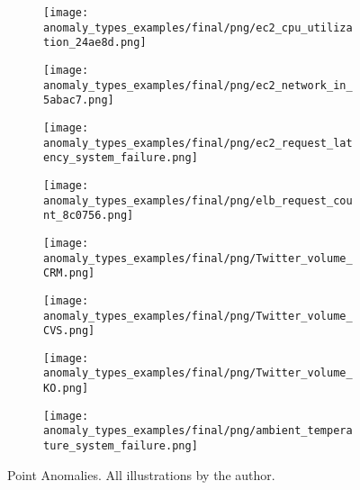 \begin{figure}[htp!]
    \centering
    \begin{subfigure}[t]{.49\linewidth}
        \centering
        \texttt{[image: anomaly\_types\_examples/final/png/ec2\_cpu\_utilization\_24ae8d.png]}
        \label{app-fig:ec2_cpu_utilization_24ae8d}
    \end{subfigure}
    \begin{subfigure}[t]{.49\linewidth}
        \centering
        \texttt{[image: anomaly\_types\_examples/final/png/ec2\_network\_in\_5abac7.png]}
        \label{app-fig:ec2_network_in_5abac7}
    \end{subfigure}
    \begin{subfigure}[t]{.49\linewidth}
        \centering
        \texttt{[image: anomaly\_types\_examples/final/png/ec2\_request\_latency\_system\_failure.png]}
        \label{app-fig:ec2_request_latency_system_failure}
    \end{subfigure}
    \begin{subfigure}[t]{.49\linewidth}
        \centering
        \texttt{[image: anomaly\_types\_examples/final/png/elb\_request\_count\_8c0756.png]}
        \label{app-fig:elb_request_count_8c0756}
    \end{subfigure}
    \begin{subfigure}[t]{.49\linewidth}
        \centering
        \texttt{[image: anomaly\_types\_examples/final/png/Twitter\_volume\_CRM.png]}
        \label{app-fig:Twitter_volume_CRM}
    \end{subfigure}
    \begin{subfigure}[t]{.49\linewidth}
        \centering
        \texttt{[image: anomaly\_types\_examples/final/png/Twitter\_volume\_CVS.png]}
        \label{app-fig:Twitter_volume_CVS}
    \end{subfigure}
    \begin{subfigure}[t]{.49\linewidth}
        \centering
        \texttt{[image: anomaly\_types\_examples/final/png/Twitter\_volume\_KO.png]}
        \label{app-fig:Twitter_volume_KO}
    \end{subfigure}
    \begin{subfigure}[t]{.49\linewidth}
        \centering
        \texttt{[image: anomaly\_types\_examples/final/png/ambient\_temperature\_system\_failure.png]}
        \label{app-fig:ambient_temperature_system_failure}
    \end{subfigure}
    \caption[Point Anomalies.]{Point Anomalies. All illustrations by the author.}\label{fig:spiking-types}
\end{figure}\clearpage
